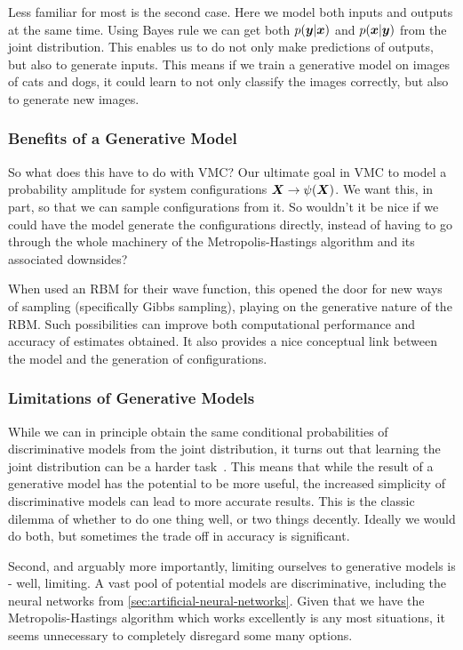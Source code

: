 \documentclass[Thesis.tex]{subfiles}
\begin{document}
Less familiar for most is the second case. Here we model both inputs and outputs
at the same time. Using Bayes rule we can get both $p(\bm{y}|\bm{x})$ and $p(\bm{x} |
\bm{y})$ from the joint distribution. This enables us to do not only make predictions of
outputs, but also to generate inputs. This means if we train a generative model
on images of cats and dogs, it could learn to not only classify the images
correctly, but also to generate new images.

\subsubsection{Benefits of a Generative Model}

So what does this have to do with VMC? Our ultimate
goal in VMC to model a probability amplitude for system configurations
$\bm{X}\rightarrow \psi(\bm{X})$. We want this, in part, so that we can sample
configurations from it. So wouldn't it be nice if we could have the model
generate the configurations directly, instead of having to go through the whole
machinery of the Metropolis-Hastings algorithm and its associated downsides?

When \textcite{Carleo602} used an RBM for their wave function, this opened the
door for new ways of sampling (specifically Gibbs sampling), playing on the
generative nature of the RBM. Such possibilities can improve both computational
performance and accuracy of estimates obtained. It also provides a nice
conceptual link between the model and the generation of configurations.

\subsubsection{Limitations of Generative Models}

While we can in principle obtain the same conditional probabilities of
discriminative models from the joint distribution, it turns out that learning
the joint distribution can be a harder task~\cite{Ng-2001}. This means that
while the result of a generative model has the potential to be more useful, the
increased simplicity of discriminative models can lead to more accurate results.
This is the classic dilemma of whether to do one thing well, or two things
decently. Ideally we would do both, but sometimes the trade off in accuracy is
significant.

Second, and arguably more importantly, limiting ourselves to generative models
is - well, limiting. A vast pool of potential models are discriminative,
including the neural networks from \cref{sec:artificial-neural-networks}. Given
that we have the Metropolis-Hastings algorithm which works excellently is any
most situations, it seems unnecessary to completely disregard some many options.
\end{document}
